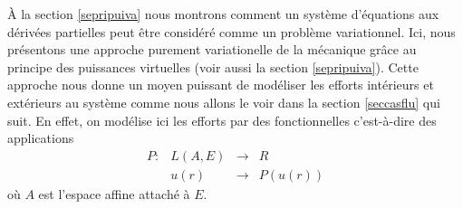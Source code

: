 \documentclass[12pt]{book}
\begin{document}
\`A la section
\ref{sepripuiva} nous montrons comment un
syst\`eme d'\'equations aux d\'eriv\'ees partielles peut \^etre
consid\'er\'e comme un probl\`eme variationnel.
Ici, nous pr\'esentons une approche purement variationelle de la
m\'ecanique gr\^ace au principe des puissances virtuelles (voir aussi
la section \ref{sepripuiva}). Cette approche nous donne un moyen
puissant de mod\'eliser les efforts int\'erieurs et ext\'erieurs au
syst\`eme comme nous allons le voir dans la section \ref{seccasflu}
qui suit. En effet, on mod\'elise ici les efforts par des
fonctionnelles c'est-\`a-dire des applications
\begin{equation}
\begin{array}{llll}
P:&L(A,E)&\longrightarrow &R\\
  &u(r)&\longrightarrow &P(u(r))
\end{array}
\end{equation}
o\`u $A$ est l'espace affine attach\'e \`a $E$.
\end{document}
